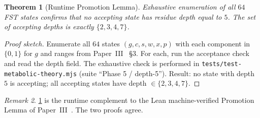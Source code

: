 \documentclass[11pt,a4paper]{article}
\theoremstyle{plain}
\newtheorem{theorem}{Theorem}[section]
\theoremstyle{definition}
\theoremstyle{remark}
\newtheorem{remark}[theorem]{Remark}
\numberwithin{equation}{section}
\begin{document}
\begin{theorem}[Runtime Promotion Lemma]
\label{thm:promotion}
Exhaustive enumeration of all $64$ FST states confirms that no
accepting state has residue depth equal to $5$. The set of
accepting depths is exactly $\{2, 3, 4, 7\}$.
\end{theorem}

\begin{proof}[Proof sketch]
Enumerate all $64$ states $(g, c, s, w, x, p)$ with each component
in $\{0, 1\}$ for $g$ and ranges from Paper~III~\cite{paper-III} \S3. For each, run
the acceptance check and read the depth field. The exhaustive
check is performed in
\texttt{tests/test-metabolic-theory.mjs} (suite ``Phase 5 / depth-5'').
Result: no state with depth $5$ is accepting; all accepting
states have depth $\in \{2, 3, 4, 7\}$.
\end{proof}

\begin{remark}
\cref{thm:promotion} is the runtime complement to the Lean
machine-verified Promotion Lemma of Paper~III~\cite{paper-III}. The two proofs
agree.
\end{remark}
\end{document}
